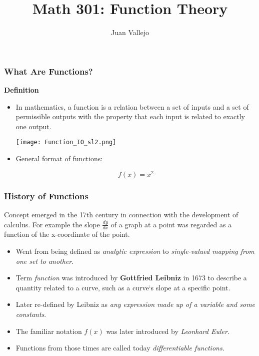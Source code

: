 \documentclass{beamer}
\begin{document}
\begin{frame}
  \title{Math 301: Function Theory}
  \author{Juan Vallejo}
  \maketitle
\end{frame}

\begin{frame}[fragile]\frametitle{What Are Functions?}
\begin{center}\textbf{Definition} \end{center}

\begin{itemize}
  \item In mathematics, a function is a relation between a set of inputs and a set of permissible outputs with the property that each input is related to exactly one output. %
  
  \vfill
  \begin{center}\texttt{[image: Function\_IO\_sl2.png]} \end{center}
  
  \vfill
  \item General format of functions:
  
  \vfill
  \begin{equation*}
    f(x) = x^2
  \end{equation*}
  \vfill

\end{itemize}

\end{frame}

\begin{frame}[fragile]\frametitle{History of Functions}
\begin{center} Concept emerged in the 17th century in connection with the development of calculus. For example the slope $\frac{dy}{dx}$ of a graph at a point was regarded as a function of the x-coordinate of the point. \end{center}

\begin{itemize}
  \item Went from being defined as \textit{analytic expression} to \textit{single-valued mapping from one set to another}.
  \item Term \textit{function} was introduced by \textbf{Gottfried Leibniz} in 1673 to describe a quantity related to a curve, such as a curve`s slope at a specific point.
  \item Later re-defined by Leibniz as \textit{any expression made up of a variable and some constants}.
  \item The familiar notation $f(x)$ was later introduced by \textit{Leonhard Euler}.
  \item Functions from those times are called today \textit{differentiable functions}.
  
\end{itemize}

\end{frame}
\end{document}
